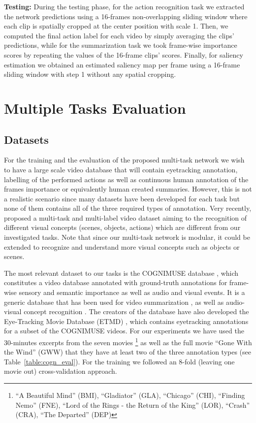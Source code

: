 \documentclass[10pt,twocolumn,letterpaper]{article}
\begin{document}
\noindent \textbf{Testing:} During the testing phase, for the action recognition task we extracted the network predictions using a 16-frames non-overlapping sliding window where each clip is spatially cropped at the center position with scale 1. Then, we computed the final action label for each video by simply averaging the clips' predictions, while for the summarization task we took frame-wise importance scores by repeating the values of the 16-frame clips' scores. Finally, for saliency estimation we obtained an estimated saliency map per frame using a 16-frame sliding window with step 1 without any spatial cropping.     

\section{Multiple Tasks Evaluation}

\subsection{Datasets}

For the training and the evaluation of the proposed multi-task network we wish to have a large scale video database that will contain eyetracking annotation, labelling of the performed actions as well as continuous human annotation of the frames importance or equivalently human created summaries. However, this is not a realistic scenario since many datasets have been developed for each task but none of them contains all of the three required types of annotation. Very recently, \cite{ray2018scenes} proposed a multi-task and multi-label video dataset aiming to the recognition of different visual concepts (scenes, objects, actions) which are different from our investigated tasks. Note that since our multi-task network is modular, it could be extended to recognize and understand more visual concepts such as objects or scenes. 

The most relevant dataset to our tasks is the \mbox{COGNIMUSE} database \cite{ZKE+_review, cogn_data}, which constitutes a video database annotated with ground-truth annotations for frame-wise sensory and semantic importance as well as  audio and visual events. It is a generic database that has been used for video summarization \cite{CVSP_ICIP2015}, as well as audio-visual concept recognition \cite{Bouritsas2018Multimodal}. The creators of the database have also developed the Eye-Tracking Movie Database (ETMD) \cite{koutras2015perceptually}, which contains eyetracking annotations for a subset of the \mbox{COGNIMUSE} videos. For our experiments we have used the 30-minutes excerpts from the seven movies \footnote{``A Beautiful Mind'' (BMI), ``Gladiator'' (GLA), ``Chicago'' (CHI), ``Finding Nemo'' (FNE), ``Lord of the Rings - the Return of the King'' (LOR), ``Crash'' (CRA), ``The Departed'' (DEP)} as well as the full movie ``Gone With the Wind'' (GWW) that they have at least two of the three annotation types (see Table~\ref{table:cogn_eval}). For the training we followed an 8-fold (leaving one movie out) cross-validation approach.
\end{document}
